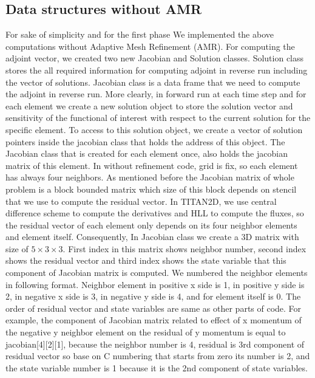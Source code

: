 \documentclass[a4paper,10pt]{article}
\begin{document}
\subsection{Data structures without AMR}
For sake of simplicity and for the first phase We implemented the above computations without Adaptive Mesh Refinement (AMR). 
For computing the adjoint vector, we created two new Jacobian  and Solution classes. 
Solution class stores the all required information for computing adjoint in reverse run including the vector of solutions. Jacobian class is a data frame that we need to compute the adjoint in reverse run. More clearly, in forward run at each time step and for each element we create a new solution object to store the solution vector and sensitivity of the functional of interest with respect to the current solution for the specific element. To access to this solution object, we create a vector of solution pointers inside the jacobian class that holds the address of this object. The Jacobian class that is created for each element once, also holds the jacobian matrix of this element. In without refinement code, grid is fix, so each element has always four neighbors. As mentioned before the Jacobian matrix of whole problem is a block bounded matrix which size of this block depends on stencil that we use to compute the residual vector. In TITAN2D, we use central difference scheme to compute the derivatives and HLL to compute the fluxes, so the residual vector of each element only depends on its four neighbor elements and element itself. Consequently, In Jacobian class we create a 3D matrix with size of $5\times3\times3$. First index in this matrix shows neighbor number, second index shows the residual vector and third index shows the state variable that this component of Jacobian matrix is computed. We numbered the neighbor elements in following format. Neighbor element in positive x side is 1, in positive y side is 2, in negative x side is 3, in negative y side is 4, and for element itself is 0. The order of residual vector and state variables are same as other parts of code. For example, the component of Jacobian matrix related to effect of x momentum of the negative y neighbor element on the residual of y momentum is equal to jacobian[4][2][1], because the neighbor  number is 4, residual is 3rd component of residual vector so base on C numbering that starts from zero its number is 2, and the state variable number is 1 because it is the 2nd component of state variables.\newline
\end{document}
